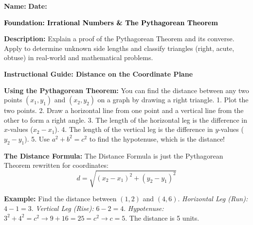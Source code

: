 \documentclass[12pt, letterpaper, fleqn]{article}
\begin{document}
\textbf{Name:} \underline{\hspace{5cm}}
\hfill
\textbf{Date:} \underline{\hspace{3cm}}\\

\begin{tcolorbox}[colback=customteal!20]
    \large\textcolor{black}{\textbf{Foundation: Irrational Numbers & The Pythagorean Theorem}}
\end{tcolorbox}

\vspace{3mm}

\noindent
\textbf{Description:} Explain a proof of the Pythagorean Theorem and its converse. Apply to determine unknown side lengths and classify triangles (right, acute, obtuse) in real-world and mathematical problems.

\vspace{4mm}


\begin{tcolorbox}[colback=white, colframe=black!25, boxrule=0.6pt, arc=4mm, left=6mm, right=6mm, top=5mm, bottom=5mm]
\textbf{Instructional Guide: Distance on the Coordinate Plane}

\medskip
\textbf{Using the Pythagorean Theorem:} You can find the distance between any two points $(x_1, y_1)$ and $(x_2, y_2)$ on a graph by drawing a right triangle.
1. Plot the two points.
2. Draw a horizontal line from one point and a vertical line from the other to form a right angle.
3. The length of the horizontal leg is the difference in $x$-values ($x_2 - x_1$).
4. The length of the vertical leg is the difference in $y$-values ($y_2 - y_1$).
5. Use $a^2 + b^2 = c^2$ to find the hypotenuse, which is the distance!

\textbf{The Distance Formula:} The Distance Formula is just the Pythagorean Theorem rewritten for coordinates:
$$ d = \sqrt{(x_2 - x_1)^2 + (y_2 - y_1)^2} $$

\vspace{2mm}
\textbf{Example:} Find the distance between $(1, 2)$ and $(4, 6)$.
\textit{Horizontal Leg (Run):} $4 - 1 = 3$.
\textit{Vertical Leg (Rise):} $6 - 2 = 4$.
\textit{Hypotenuse:} $3^2 + 4^2 = c^2 \rightarrow 9 + 16 = 25 = c^2 \rightarrow c = 5$.
The distance is 5 units.
\end{tcolorbox}

\vspace{4mm}
\end{document}
